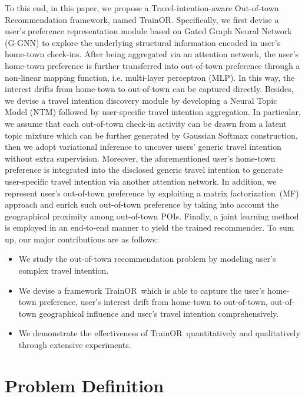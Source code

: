 \documentclass[letterpaper]{article} %
\newcommand{\ourmodel}{{\sc TrainOR}}
\begin{document}
% 
To this end, in this paper, we propose a {\sc Tra}vel-{\sc in}tention-aware {\sc O}ut-of-town {\sc R}ecommendation framework, named \ourmodel. 
Specifically, 
we first devise a user's preference representation module based on Gated Graph Neural Network (G-GNN) to explore the underlying structural information encoded in user's home-town check-ins. 
After being aggregated via an attention network, the user's home-town preference is further transferred into out-of-town preference through a non-linear mapping function, i.e. multi-layer perceptron (MLP).
In this way, the interest drifts from home-town to out-of-town can be captured directly. 
Besides, we devise a travel intention discovery module by developing a Neural Topic Model (NTM) followed by user-specific travel intention aggregation. 
In particular, we assume that each out-of-town check-in activity can be drawn from a latent topic mixture which can be further generated by Gaussian Softmax construction, then we adopt variational inference to uncover users' generic travel intention without extra supervision. 
Moreover, the aforementioned user's home-town preference is integrated into the disclosed generic travel intention to generate user-specific travel intention via another attention network. 
In addition, we represent user's out-of-town preference by exploiting a matrix factorization~(MF) approach and enrich such out-of-town preference by taking into account the geographical proximity among out-of-town POIs.
Finally, a joint learning method is employed in an end-to-end manner to yield the trained recommender.
To sum up, our major contributions are as follows:
\begin{itemize}
    \item 
    We study the out-of-town recommendation problem by modeling user's complex travel intention. 
    \item
    We devise a framework \ourmodel~which is able to capture the user's home-town preference, user's interest drift from home-town to out-of-town, out-of-town geographical influence and user's travel intention comprehensively. 
    \item
    We demonstrate the effectiveness of \ourmodel~quantitatively and qualitatively through extensive experiments.
\end{itemize}


\section{Problem Definition} \label{sec:pre}
\end{document}
